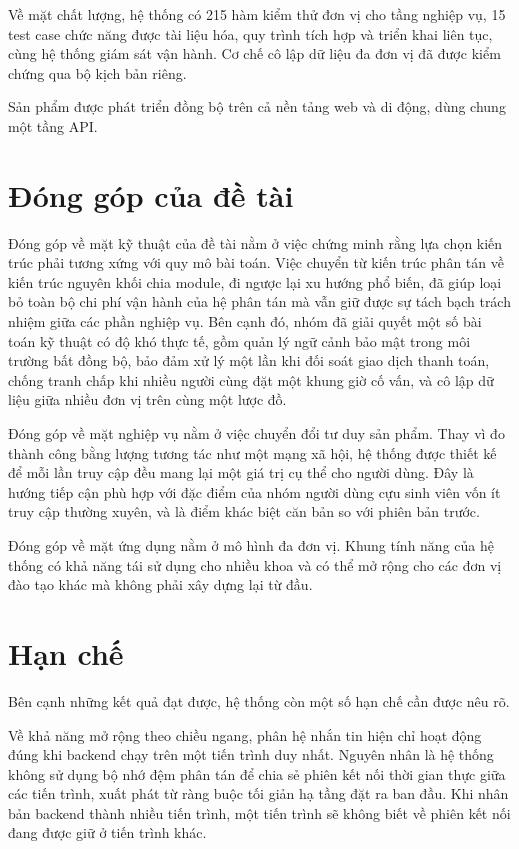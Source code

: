 \documentclass[12pt,a4paper,oneside]{report}
\begin{document}
Về mặt chất lượng, hệ thống có 215 hàm kiểm thử đơn vị cho tầng nghiệp vụ, 15 test case chức năng được tài liệu hóa, quy trình tích hợp và triển khai liên tục, cùng hệ thống giám sát vận hành. Cơ chế cô lập dữ liệu đa đơn vị đã được kiểm chứng qua bộ kịch bản riêng.

Sản phẩm được phát triển đồng bộ trên cả nền tảng web và di động, dùng chung một tầng API.

\section{Đóng góp của đề tài}

Đóng góp về mặt kỹ thuật của đề tài nằm ở việc chứng minh rằng lựa chọn kiến trúc phải tương xứng với quy mô bài toán. Việc chuyển từ kiến trúc phân tán về kiến trúc nguyên khối chia module, đi ngược lại xu hướng phổ biến, đã giúp loại bỏ toàn bộ chi phí vận hành của hệ phân tán mà vẫn giữ được sự tách bạch trách nhiệm giữa các phần nghiệp vụ. Bên cạnh đó, nhóm đã giải quyết một số bài toán kỹ thuật có độ khó thực tế, gồm quản lý ngữ cảnh bảo mật trong môi trường bất đồng bộ, bảo đảm xử lý một lần khi đối soát giao dịch thanh toán, chống tranh chấp khi nhiều người cùng đặt một khung giờ cố vấn, và cô lập dữ liệu giữa nhiều đơn vị trên cùng một lược đồ.

Đóng góp về mặt nghiệp vụ nằm ở việc chuyển đổi tư duy sản phẩm. Thay vì đo thành công bằng lượng tương tác như một mạng xã hội, hệ thống được thiết kế để mỗi lần truy cập đều mang lại một giá trị cụ thể cho người dùng. Đây là hướng tiếp cận phù hợp với đặc điểm của nhóm người dùng cựu sinh viên vốn ít truy cập thường xuyên, và là điểm khác biệt căn bản so với phiên bản trước.

Đóng góp về mặt ứng dụng nằm ở mô hình đa đơn vị. Khung tính năng của hệ thống có khả năng tái sử dụng cho nhiều khoa và có thể mở rộng cho các đơn vị đào tạo khác mà không phải xây dựng lại từ đầu.

\section{Hạn chế}
\label{sec:limitations}

Bên cạnh những kết quả đạt được, hệ thống còn một số hạn chế cần được nêu rõ.

Về khả năng mở rộng theo chiều ngang, phân hệ nhắn tin hiện chỉ hoạt động đúng khi backend chạy trên một tiến trình duy nhất. Nguyên nhân là hệ thống không sử dụng bộ nhớ đệm phân tán để chia sẻ phiên kết nối thời gian thực giữa các tiến trình, xuất phát từ ràng buộc tối giản hạ tầng đặt ra ban đầu. Khi nhân bản backend thành nhiều tiến trình, một tiến trình sẽ không biết về phiên kết nối đang được giữ ở tiến trình khác.
\end{document}

